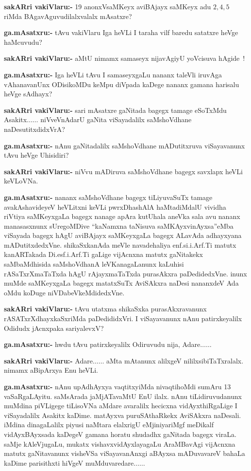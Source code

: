 \smallskip
\noindent
\textbf{sakARri vakiVlaru:-} {\rm 19} anonxVsaMKeyx aviBAjayx saMKeyx adu $2, 4, 5$ riMda BAgavAguvudilalxvalalx mAsatxre?

\smallskip
\noindent
\textbf{ga.mAsatxru:-} tAvu vakiVlaru Iga heVLi I taraha vilf baredu satatxre heVge haMcuvudu?

\smallskip
\noindent
\textbf{sakARri vakiVlaru:-} aMtU nimamx samaseyx nijavAgiyU yoVcisuva hAgide~!

\smallskip
\noindent
\textbf{ga.mAsatxru:-} Iga heVLi tAvu I samaseyxgaLu nananx taleVli iruvAga vAhanavanUnx ODisikoMDu keMpu diVpada kaDege nananx gamana harisalu heVge sAdhayx?

\smallskip
\noindent
\textbf{sakARri vakiVlaru:-} sari mAsatxre gaNitada bagegx tamage eSoTxMdu Asakitx$\ldots\ldots$ niVveVnAdarU gaNita viSayadalilx saMshoVdhane naDesutitxdidxVrA?

\smallskip
\noindent
\textbf{ga.mAsatxru:-} nAnu gaNitadalilx saMshoVdhane mADutitxruva viSayavanunx tAvu heVge Uhisidiri?

\smallskip
\noindent
\textbf{sakARri vakiVlaru:-} niVvu mADiruva saMshoVdhane bagegx savxlapx heVLi keVLoVNa.

\smallskip
\noindent
\textbf{ga.mAsatxru:-} nananx saMshoVdhane bagegx tiLiyuvaSuTx tamage avakAshavideyeV heVLitxni keVLi pwrxDhashAlA haMtadiMdalU vividha riVtiya saMKeyxgaLa bagegx nanage apAra kutUhala aneVka sala avu nananx manasasxnunx sUregoMDive ``kaNamxna taNisuva saMKAyxvinAyxsa''eMba viSayada bagegx hAgU aviBAjayx saMKeyxgaLa bagegx ALavAda adhayxyana mADutitxdedxVne. shikaSxkanAda meVle navadehaliya enf.si.i.Arf.Ti matutx kanARTakada Di.esf.i.Arf.Ti gaLige vijAcnxna matutx gaNitakekx saMbaMdhisida saMshoVdhanA leVKanagaLanunx kaLuhisi rASaTxrXmaTaTxda hAgU rAjayxmaTaTxda purasAkxra paDedidedxVne. inunx muMde saMKeyxgaLa bagegx matatxSuTx AviSAkxra naDesi nananxdeV Ada oMdu koDuge niVDabeVkeMdidedxVne.

\smallskip
\noindent
\textbf{sakARri vakiVlaru:-} tAvu utatxma shikaSxka purasAkxravanunx rASATxrXdhayxkaSxriMda paDedididxVri. I viSayavanunx nAnu patirxkeyalilx Odidudx jAcnxpaka sariyalevxV?

\smallskip
\noindent
\textbf{ga.mAsatxru:-} hwdu tAvu patirxkeyalilx Odiruvudu nija, Adare$\ldots\ldots$

\smallskip
\noindent
\textbf{sakARri vakiVlaru:-} Adare$\ldots\ldots$ aMta mAtanunx alilxgeV nililxsibiTaTxralalx. nimamx aBipArxya Enu heVLi.

\smallskip
\noindent
\textbf{ga.mAsatxru:-} nAnu upAdhAyxya vaqtitxyiMda nivaqtihoMdi sumAru {\rm 13} vaSaR\-gaLAyitu. saMsArada jaMjATavaMtU EnU ilalx. nAnu tiLidiruvudanunx muMdina piVLigege tiLisoVNa aMdare avaralilx hecicxna vidAyxthiRgaLige I viSayadalilx Asakitx kaDime. matAyxva puruSAthaRkekx AviSAkxra naDesali. iMdina dinagaLalilx piyusi naMtara elalxrigU eMjiniyariMgf meDikalf vidAyxBAyxsada kaDegeV gamana horatu shudadhx gaNitada bagegx viraLa. saMje kAleVjugaLu, mukatx vishavxvidAyxlayagaLu AraMBavAgi vijAcnxna matutx gaNitavanunx visheVSa viSayavanAnxgi aBAyxsa mADuvavareV bahaLa kaDime parisithxti hiVgeV muMduvaredare$\ldots\ldots$

